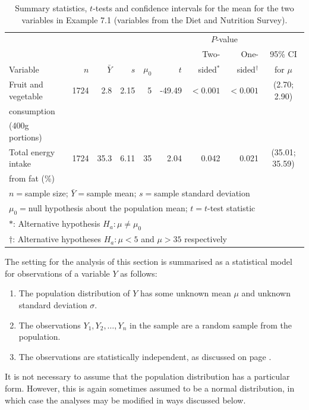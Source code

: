 \begin{table}
\caption{Summary statistics, $t$-tests and confidence intervals
for the mean for the two variables in Example 7.1
(variables from the Diet and Nutrition Survey).}
\label{t_ttests1}
\begin{center}
\begin{tabular}{|l|rrr|rrrr|c|}\hline
 & & & & & &\multicolumn{2}{c|}{$P$-value} & \\
  & & & & & & Two-& One- & 95\% CI \\
Variable&   $n$ & $\bar{Y}$ & $s$ & $\mu_{0}$ & $t$ & sided$^{*}$
& sided$^{\dagger}$ & for $\mu$\\
\hline
Fruit and vegetable & 1724 & 2.8 & 2.15
& 5 & -49.49 & $<0.001$&
$<0.001$& (2.70; 2.90)\\
consumption &  & & & & & & & \\
(400g portions)  & &  & & & & & & \\[1ex]
Total energy intake & 1724 & 35.3& 6.11 & 35 & 2.04 & 0.042 &
0.021 & (35.01; 35.59)\\
from fat (\%) & & & & & &  & & \\
\hline
\multicolumn{9}{l}{{\footnotesize $n=$sample size; $\bar{Y}=$sample
mean; $s=$sample standard deviation
}}\\
\multicolumn{9}{l}{{\footnotesize$\mu_{0}=$null hypothesis about the
population mean; $t=t$-test statistic}}\\
\multicolumn{9}{l}{{\footnotesize $*$: Alternative hypothesis $H_{a}:
\mu\ne \mu_{0}$}}\\
\multicolumn{9}{l}{{\footnotesize $\dagger$: Alternative hypotheses $H_{a}:
\mu<5$ and $\mu>35$ respectively}}
\end{tabular}
\end{center}
\end{table}

The setting for the analysis of this section is summarised as a
statistical model for observations of a variable $Y$ as follows:
\begin{enumerate}
\item
The population distribution of
$Y$ has some unknown mean $\mu$ and unknown standard deviation $\sigma$.
\item
The observations $Y_{1}, Y_{2}, \dots, Y_{n}$ in the sample are a
random sample from the population.
\item
The observations are statistically independent,
as discussed on
page \pageref{p_2sample}.
\end{enumerate}
It is not necessary to assume that the population distribution
has a particular form. However, this is again sometimes assumed to be a normal
distribution, in which case the analyses may be modified in ways
discussed below.

